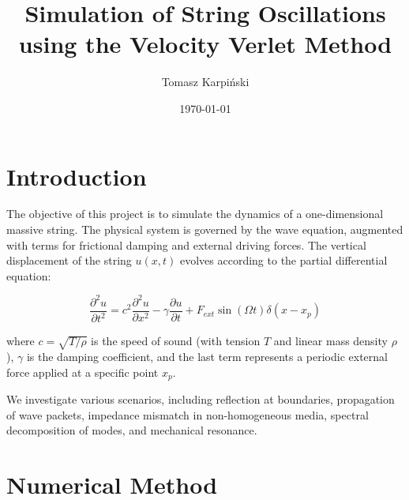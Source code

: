 \documentclass[a4paper,11pt]{article}
\title{Simulation of String Oscillations using the Velocity Verlet Method}
\author{Tomasz Karpiński}
\date{\today}
\begin{document}
\maketitle

\section{Introduction}
The objective of this project is to simulate the dynamics of a one-dimensional massive string. The physical system is governed by the wave equation, augmented with terms for frictional damping and external driving forces. The vertical displacement of the string $u(x,t)$ evolves according to the partial differential equation:

\begin{equation}
    \frac{\partial^2 u}{\partial t^2} = c^2 \frac{\partial^2 u}{\partial x^2} - \gamma \frac{\partial u}{\partial t} + F_{ext} \sin(\Omega t) \delta(x - x_p)
    \label{eq:wave}
\end{equation}

where $c = \sqrt{T/\rho}$ is the speed of sound (with tension $T$ and linear mass density $\rho$), $\gamma$ is the damping coefficient, and the last term represents a periodic external force applied at a specific point $x_p$.

We investigate various scenarios, including reflection at boundaries, propagation of wave packets, impedance mismatch in non-homogeneous media, spectral decomposition of modes, and mechanical resonance.

\section{Numerical Method}
\end{document}
